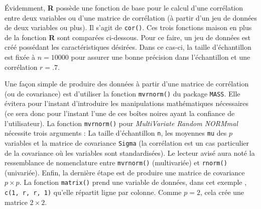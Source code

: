\documentclass[
]{book}
\begin{document}
Évidemment, \textbf{R} possède une fonction de base pour le calcul d'une corrélation entre deux variables ou d'une matrice de corrélation (à partir d'un jeu de données de deux variables ou plus). Il s'agit de \texttt{cor()}. Ces trois fonctions maison en plus de la fonction \textbf{R} sont comparées ci-dessous. Pour ce faire, un jeu de données est créé possédant les caractéristiques désirées. Dans ce cas-ci, la taille d'échantillon est fixée à \(n=10000\) pour assurer une bonne précision dans l'échantillon et une corrélation \(r=.7\).

Une façon simple de produire des données à partir d'une matrice de corrélation (ou de covariance) est d'utiliser la fonction \texttt{mvrnorm()} du package \texttt{MASS}. Elle évitera pour l'instant d'introduire les manipulations mathématiques nécessaires (ce sera donc pour l'instant l'une de ces boîtes noires ayant la confiance de l'utilisateur). La fonction \texttt{mvrnorm()} pour \emph{MultiVariate Random NORMmal} nécessite trois arguments : La taille d'échantillon \texttt{n}, les moyennes \texttt{mu} des \(p\) variables et la matrice de covariance \texttt{Sigma} (la corrélation est un cas particulier de la covariance où les variables sont standardisées). Le lecteur avisé aura noté la ressemblance de nomenclature entre \texttt{mvrnorm()} (multivariée) et
\texttt{rnorm()} (univariée). Enfin, la dernière étape est de produire une matrice de covariance \(p \times p\). La fonction \texttt{matrix()} prend une variable de données, dans cet exemple , \texttt{c(1,\ r,\ r,\ 1)} qu'elle répartit ligne par colonne. Comme \(p=2\), cela crée une matrice \(2 \times 2\).
\end{document}
